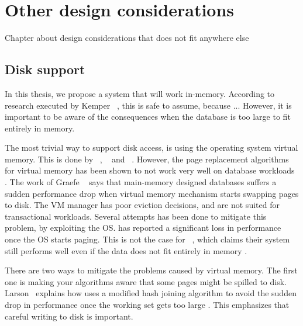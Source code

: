 \chapter{Other design considerations}
\label{chap:Other design considerations}
\begin{secex}
  Chapter about design considerations that does not fit anywhere else
\end{secex}

\section{Disk support}
\label{sec:Disk support}
In this thesis, we propose a system that will work in-memory. According to research executed by Kemper \ea~\cite{Kemper2011-ap}, this is safe to assume, because ... However, it is important to be aware of the consequences when the database is too large to fit entirely in memory.

The most trivial way to support disk access, is using the operating system virtual memory. This is done by \monetdb~\cite{Boncz2002-yj}, \blink~\cite{Barber2014-ey} and \qlikview~\cite{Qlik2011-ef}. However, the page replacement algorithms for virtual memory has been shown to not work very well on database workloads . The work of Graefe \ea~\cite{Graefe2014-ds} says that main-memory designed databases suffers a sudden performance drop when virtual memory mechanism starts swapping pages to disk. The VM manager has poor eviction decisions, and are not suited for transactional workloads. Several attempts has been done to mitigate this problem, by exploiting the OS. \qlikview has reported a significant loss in performance once the OS starts paging. This is not the case for \tableau~, which claims their system still performs well even if the data does not fit entirely in memory \cite{Kamkolkar2015-iq}.

There are two ways to mitigate the problems caused by virtual memory. The first one is making your algorithms aware that some pages might be spilled to disk. Larson \ea~explains how \mssql uses a modified hash joining algorithm to avoid the sudden drop in performance once the working set gets too large \cite{Larson2013-mc}. This emphasizes that careful writing to disk is important.

